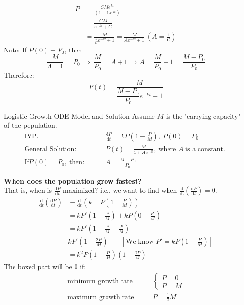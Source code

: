 \documentclass[12pt,a4paper]{article}
\def\d{{\mathrm{d}}}
\begin{document}
\begin{enumerate}
$$\begin{aligned}
		P&=\frac{CMe^{kt}}{\left(1+Ce^{kt}\right)}\\
		&=\frac{CM}{e^{-kt}+C}\\
		&=\frac{M}{\frac{1}{C}e^{-kt}+1}=\frac{M}{Ae^{-kt}+1}\ \left(A=\frac{1}{C}\right)
	\end{aligned}$$
	Note: If $P(0)=P_0$, then
	$$\frac{M}{A+1}=P_0\ \Rightarrow\ \frac{M}{P_0}=A+1\ \Rightarrow A=\frac{M}{P_0}-1=\frac{M-P_0}{P_0}$$
	Therefore: $$P(t)=\frac{M}{\dfrac{M-P_0}{P_0}e^{-kt}+1}$$
	\begin{thm}{Logistic Growth ODE Model and Solution}
		Assume $M$ is the "carrying capacity" of the population. 
		$$\begin{aligned}
			\text{IVP: }&\qquad\frac{\d P}{\d t}=kP\left(1-\frac{P}{M}\right),\ P(0)=P_0\\
			\text{General Solution: }&\qquad P(t)=\frac{M}{1+Ae^{-kt}},\ \text{where }A\text{ is a constant. }\\
			\text{If} P(0)=P_0,\ \text{then: }&\qquad A=\frac{M-P_0}{P_0}
		\end{aligned}$$	
	\end{thm}
	\textbf{When does the population grow fastest? }\\
	That is, when is $\displaystyle\frac{\d P}{\d t}$ maximized? i.e., we want to find when $\displaystyle\frac{\d}{\d t}\left(\frac{\d P}{\d t}\right)=0$.
	$$\begin{aligned}
		\frac{\d}{\d t}\left(\frac{\d P}{\d t}\right)&=\frac{\d}{\d t}\left(k-P\left(1-\frac{P}{M}\right)\right)\\
		&=kP'\left(1-\frac{P}{M}\right)+kP\left(0-\frac{P'}{M}\right)\\
		&=kP'\left(1-\frac{P}{M}-\frac{P}{M}\right)\\
		&kP'\left(1-\frac{2P}{M}\right)\qquad\left[\text{We know }P'=kP\left(1-\frac{P}{M}\right)\right]\\
		&=k^2\boxed{P\left(1-\frac{P}{M}\right)\left(1-\frac{2P}{M}\right)}
	\end{aligned}$$
	The boxed part will be $0$ if: 
	$$\begin{aligned}
		\text{minimum growth rate}&\qquad\begin{cases}P=0\\ P=M\end{cases}\\
		\text{maximum growth rate}&\qquad P=\frac{1}{2}M
	\end{aligned}$$
\end{enumerate}
\end{document}
